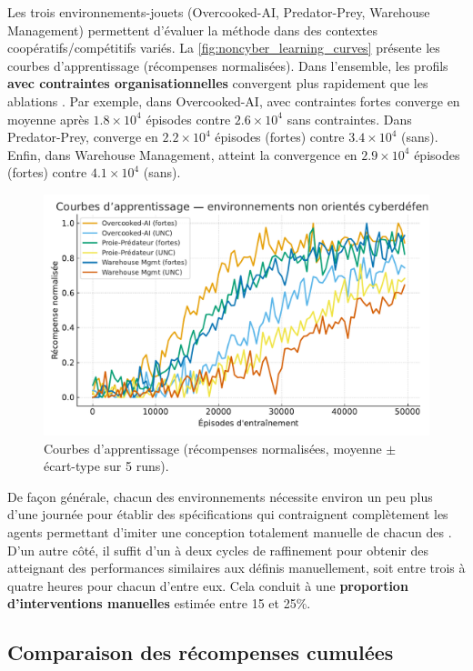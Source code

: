 Les trois environnements-jouets (Overcooked-AI, Predator-Prey, Warehouse Management) permettent d'évaluer la méthode  dans des contextes coopératifs/compétitifs variés.
La \autoref{fig:noncyber_learning_curves} présente les courbes d'apprentissage (récompenses normalisées).
Dans l'ensemble, les profils \textbf{avec contraintes organisationnelles} convergent plus rapidement que les ablations .
Par exemple, dans Overcooked-AI,  avec contraintes fortes converge en moyenne après $1.8\times 10^4$ épisodes contre $2.6\times 10^4$ sans contraintes.
Dans Predator-Prey,  converge en $2.2\times 10^4$ épisodes (fortes) contre $3.4\times 10^4$ (sans).
Enfin, dans Warehouse Management,  atteint la convergence en $2.9\times 10^4$ épisodes (fortes) contre $4.1\times 10^4$ (sans).

\begin{figure}[h!]
  \centering
  \includegraphics[width=0.75\linewidth]{figures/results_noncyber_learning.pdf}
  \caption{Courbes d'apprentissage (récompenses normalisées, moyenne $\pm$ écart-type sur 5 runs).}
  \label{fig:noncyber_learning_curves}
\end{figure}

De façon générale, chacun des environnements nécessite environ un peu plus d'une journée pour établir des spécifications qui contraignent complètement les agents permettant d'imiter une conception totalement manuelle de chacun des . D'un autre côté, il suffit d’un à deux cycles de raffinement pour obtenir des  atteignant des performances similaires aux  définis manuellement, soit entre trois à quatre heures pour chacun d'entre eux. Cela conduit à une \textbf{proportion d'interventions manuelles} estimée entre 15 et 25\%.


\subsection*{Comparaison des récompenses cumulées}

